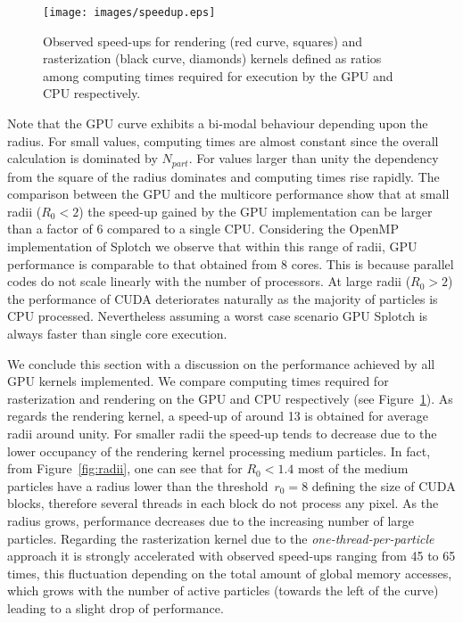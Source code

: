 \documentclass[1p]{elsarticle}
\begin{document}
\begin{figure}
\centering
\texttt{[image: images/speedup.eps]}
\caption{
Observed speed-ups for rendering (red curve, squares) and rasterization (black curve, diamonds) kernels defined as ratios among computing times required for execution by the GPU and CPU respectively.
}
\label{fig:speedup}
\end{figure}

Note that the GPU curve exhibits a bi-modal behaviour depending upon the radius. For small values, computing times are almost constant since the overall calculation is dominated by $N_{part}$. For values larger than unity the dependency from the square of the radius dominates and computing times rise rapidly. The comparison between the GPU and the multicore performance show that at small radii ($R_0 < 2$) the speed-up gained by the GPU implementation can be larger than a factor of 6 compared to a single CPU. Considering the OpenMP implementation of Splotch we observe that within this range of radii, GPU performance is comparable to that obtained from 8 cores. This is because parallel codes do not scale linearly with the number of processors. At large radii ($R_0 > 2$) the performance of CUDA deteriorates naturally as the majority of particles is CPU processed. Nevertheless assuming a worst case scenario GPU Splotch is always faster than single core execution. 

We conclude this section with a discussion on the performance achieved by all GPU kernels implemented. 
We compare computing times required for rasterization and rendering on the 
GPU and CPU respectively (see Figure~\ref{fig:speedup}). 
As regards the rendering kernel, a speed-up of around 13 is obtained for average radii around unity. For smaller radii the speed-up
tends to decrease due to the lower occupancy of the rendering kernel processing medium particles.
In fact, from Figure~\ref{fig:radii}, one can see that for $R_0<1.4$ most of the medium particles have a radius lower than the threshold~$r_0=8$ defining the size of CUDA blocks, therefore several threads in each block do not process any pixel.
As the radius grows, performance decreases due to the increasing number of large particles.
Regarding the rasterization kernel due to the {\it one-thread-per-particle} approach it is strongly accelerated with observed speed-ups ranging from 45 to 65 times, this fluctuation depending on the total amount of global memory accesses, which grows with the number of active particles (towards the left of the curve) leading to a slight drop of performance. 
\end{document}
